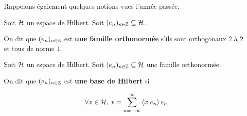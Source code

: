 Rappelons également quelques notions vues l'année passée.

\begin{definition}
	Soit $\mathcal{H}$ un espace de Hilbert.
	Soit $(e_{n})_{n \in \mathbb{Z}} \subseteq \mathcal{H}$.

	On dit que $(e_{n})_{n \in \mathbb{Z}}$ est \textbf{une famille
	orthonormée} s'ils sont orthogonaux 2 à 2 et tous de norme $1$.
\end{definition}

\begin{definition}
	Soit $\mathcal{H}$ un espace de Hilbert.
	Soit $(e_{n})_{n \in \mathbb{Z}} \subseteq \mathcal{H}$ une famille
	orthonormée.

	On dit que $(e_{n})_{n \in \mathbb{Z}}$ est \textbf{une base de Hilbert} si

	\begin{equation}
	\forall x \in \mathcal{H}, \, x = \displaystyle \sum_{n = -\infty}^{\infty}
	\bra{x}\ket{e_{n}} e_{n}
	\end{equation}

\end{definition}

\begin{proposition}
	
\end{proposition}
